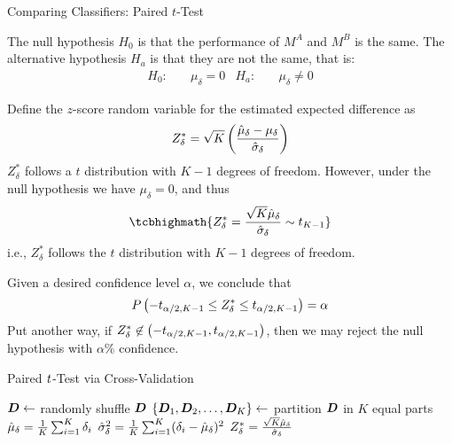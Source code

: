 \begin{frame}{Comparing Classif\/{i}ers: Paired $t$-Test}
\small
  
The null hypothesis $H_0$ is that the
performance of $M^A$ and $M^B$ is the same.
The alternative hypothesis $H_a$ is that they are
not the same, that is:
\begin{align*}
  H_0\!: & \quad \mu_\delta = 0 & H_a\!: & \quad\mu_\delta \ne 0
\end{align*}

\medskip
Def\/{i}ne the $z$-score random variable for the estimated
expected difference as
\begin{align*}
  Z^*_\delta = \sqrt{K} \left( {\hat{\mu}_\delta  - \mu_\delta \over \hat{\sigma}_\delta} \right)
\end{align*}
$Z^*_\delta$ follows a $t$
distribution with $K-1$ degrees of freedom. However, under the
null hypothesis we have $\mu_\delta = 0$, and thus
\begin{align*}
\tcbhighmath{
  Z^*_\delta = {\sqrt{K} \hmu_\delta \over \hsigma_\delta} \sim t_{K-1}
}
\end{align*}
i.e., $Z^*_\delta$
follows the $t$ distribution with $K-1$ degrees of freedom.

\medskip
Given a desired conf\/{i}dence level $\alpha$, we conclude that
\begin{align*}
  P\left(-t_{\alpha/2,K-1} \le Z^*_\delta \le t_{\alpha/2,K-1}\right) =
  \alpha
\end{align*}
Put another way, if $Z^*_\delta \not\in \left(-t_{\alpha/2,K-1},
t_{\alpha/2,K-1} \right)$, then we may reject the null hypothesis
with $\alpha\%$ conf\/{i}dence. 
\end{frame}



\newcommand{\algpairedTtest}{\textsc{Paired $t$-Test}}
\begin{frame}[fragile]{Paired ${\it t}$-Test via Cross-Validation}
\begin{tightalgo}[H]{\textwidth-18pt}
\SetKwInOut{Algorithm}{\algpairedTtest ($\alpha$, $K$, $\bD$)}
\Algorithm{}
${\boldsymbol D} \gets $ randomly shuffle $\bD$\;
$\{{\boldsymbol D}_1, {\boldsymbol D}_2, \ldots, {\boldsymbol D}_K\} \gets$ partition $\bD$ in $K$ equal parts\;
$\hat{\mu}_\delta = {1\over K} \sum_{i=1}^K \delta_i$\;
$\hat{\sigma}^2_\delta  = {1\over K} \sum_{i=1}^K (\delta_i - \hat{\mu}_\delta)^2$\;
$Z^*_\delta = {\sqrt{K} \hat{\mu}_\delta \over \hat{\sigma}_\delta}$\;
\end{tightalgo}
\end{frame}


